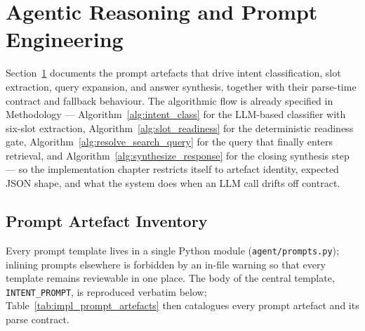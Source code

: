 \section{Agentic Reasoning and Prompt Engineering}
\label{sec:impl_prompts}

Section~\ref{sec:impl_prompts} documents the prompt artefacts that drive intent classification, slot extraction, query expansion, and answer synthesis, together with their parse-time contract and fallback behaviour. The algorithmic flow is already specified in Methodology --- Algorithm~\ref{alg:intent_class} for the LLM-based classifier with six-slot extraction, Algorithm~\ref{alg:slot_readiness} for the deterministic readiness gate, Algorithm~\ref{alg:resolve_search_query} for the query that finally enters retrieval, and Algorithm~\ref{alg:synthesize_response} for the closing synthesis step --- so the implementation chapter restricts itself to artefact identity, expected JSON shape, and what the system does when an LLM call drifts off contract.

\subsection{Prompt Artefact Inventory}

Every prompt template lives in a single Python module (\texttt{agent/prompts.py}); inlining prompts elsewhere is forbidden by an in-file warning so that every template remains reviewable in one place. The body of the central template, \texttt{INTENT\_PROMPT}, is reproduced verbatim below; Table~\ref{tab:impl_prompt_artefacts} then catalogues every prompt artefact and its parse contract.


